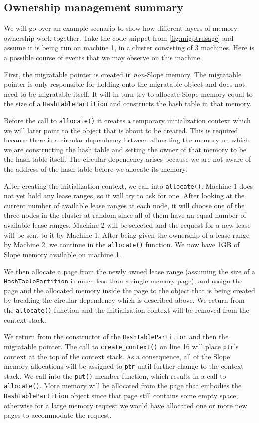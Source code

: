 \subsection{Ownership management summary}
We will go over an example scenario to show how different layers of memory
ownership work together. Take the code snippet from \autoref{fig:migptrusage}
and assume it is being run on machine 1, in a cluster consisting of 3 machines.
Here is a possible course of events that we may observe on this machine.

First, the migratable pointer is created in \emph{non}-Slope memory. The
migratable pointer is only responsible for holding onto the migratable object
and does not need to be migratable itself. It will in turn try to allocate
Slope memory equal to the size of a \texttt{HashTablePartition} and constructs the
hash table in that memory.

Before the call to \texttt{allocate()} it creates
a temporary initialization context which we will later point to the object
that is about to be created. This is required because there is a circular
dependency between allocating the memory on which we are constructing the
hash table and setting the owner of that memory to be the hash table itself.
The circular dependency arises because we are not aware of the address of the
hash table before we allocate its memory.

After creating the initialization context, we call into \texttt{allocate()}.
Machine 1 does not yet hold any lease ranges, so it will try to ask for one.
After looking at the current number of available lease ranges at each node,
it will choose one of the three nodes in the cluster at random since all of them
have an equal number of available lease ranges. Machine 2 will be selected and
the request for a new lease will be sent to it by Machine 1. After being given
the ownership of a lease range by Machine 2, we continue in the
\texttt{allocate()} function. We now have 1GB of Slope memory available on
machine 1.

We then allocate a page from the newly owned lease range (assuming the size of
a \texttt{HashTablePartition} is much less than a single memory page), and assign the
page and the allocated memory inside the page to the object that is being
created by breaking the circular dependency which is described above.
We return from the \texttt{allocate()} function and the initialization context
will be removed from the context stack.

We return from the constructor of the \texttt{HashTablePartition} and then
the migratable pointer. The call to \texttt{create\_context()} on line 16
will place
\texttt{ptr}'s context at the top of the context stack. As a consequence, all of the
Slope memory allocations will be assigned to \texttt{ptr} until further change
to the context stack. We call into the \texttt{put()} member function, which
results in a call to \texttt{allocate()}. More memory will be allocated from
the page that embodies the \texttt{HashTablePartition} object since that page
still contains some empty space, otherwise for a large memory request we would
have allocated one or more new pages to accommodate the request.

